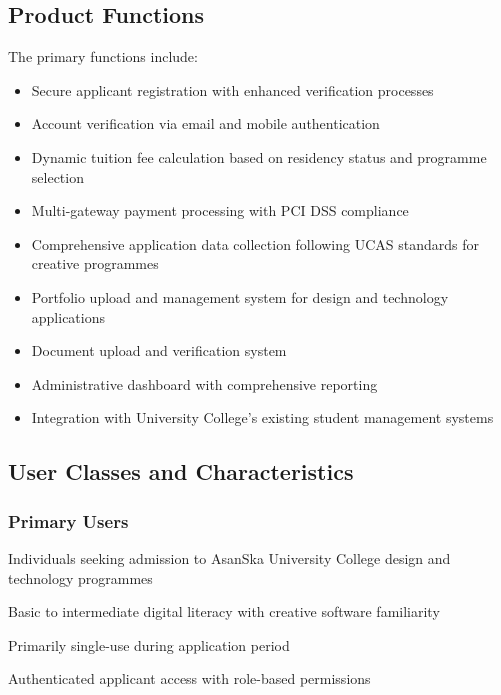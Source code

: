 \documentclass[11pt]{article}
\begin{document}
\subsection{Product Functions}
The primary functions include:
\begin{itemize}
    \item Secure applicant registration with enhanced verification processes
    \item Account verification via email and mobile authentication
    \item Dynamic tuition fee calculation based on residency status and programme selection
    \item Multi-gateway payment processing with PCI DSS compliance
    \item Comprehensive application data collection following UCAS standards for creative programmes
    \item Portfolio upload and management system for design and technology applications
    \item Document upload and verification system
    \item Administrative dashboard with comprehensive reporting
    \item Integration with University College's existing student management systems
\end{itemize}

\subsection{User Classes and Characteristics}
\subsubsection{Primary Users}
\begin{description}[font=\normalfont\sffamily\bfseries,labelwidth=3cm,leftmargin=3.2cm]
    \item[Prospective Applicants] Individuals seeking admission to AsanSka University College design and technology programmes
    \item[Technical expertise] Basic to intermediate digital literacy with creative software familiarity
    \item[Frequency of use] Primarily single-use during application period
    \item[Security level] Authenticated applicant access with role-based permissions
\end{description}
\end{document}
